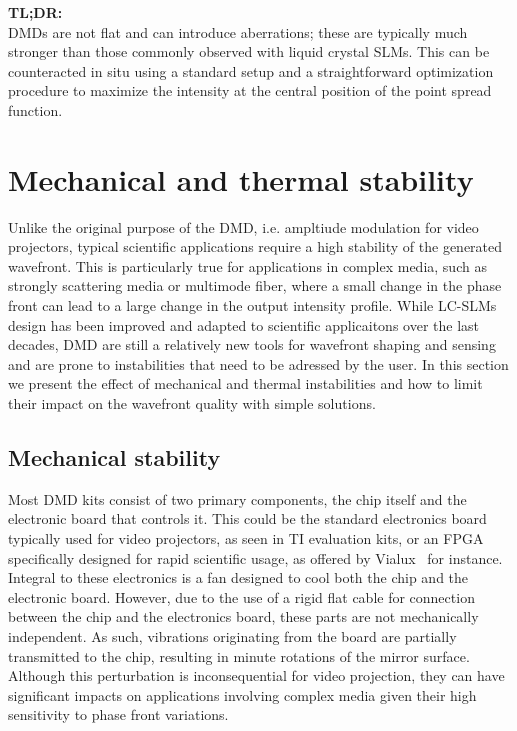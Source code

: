 \documentclass[12pt]{iopart}
\begin{document}
\begin{tldr}
  \textbf{TL;DR:}\\
  DMDs are not flat and can introduce aberrations;
  these are typically much stronger than those commonly observed with liquid crystal SLMs.
  This can be counteracted in situ using a standard setup and a straightforward optimization procedure
  to maximize the intensity at the central position of the point spread function.
\end{tldr}


\section{Mechanical and thermal stability}

Unlike the original purpose of the DMD, i.e. ampltiude modulation for video projectors,
typical scientific applications require a high stability of the generated wavefront.
This is particularly true for applications in complex media,
such as strongly scattering media or multimode fiber,
where a small change in the phase front can lead to a large change in the output intensity profile.
While LC-SLMs design has been improved and adapted to scientific applicaitons
over the last decades,
DMD are still a relatively new tools for wavefront shaping and sensing
and are prone to instabilities that need to be adressed by the user.
In this section we present the effect of mechanical and thermal instabilities
and how to limit their impact on the wavefront quality with simple solutions.\\


\subsection{Mechanical stability}


Most DMD kits consist of two primary components,
the chip itself and the electronic board that controls it.
This could be the standard electronics board typically used for video projectors,
as seen in TI evaluation kits,
or an FPGA specifically designed for rapid scientific usage,
as offered by Vialux~\cite{vialux} for instance.
Integral to these electronics is a fan designed to cool both the chip and the electronic board.
However, due to the use of a rigid flat cable for connection between the chip and the electronics board,
these parts are not mechanically independent.
As such, vibrations originating from the board are partially transmitted to the chip,
resulting in minute rotations of the mirror surface.
Although this perturbation is inconsequential for video projection,
they can have significant impacts on applications involving complex media
given their high sensitivity to phase front variations.\\
\end{document}
